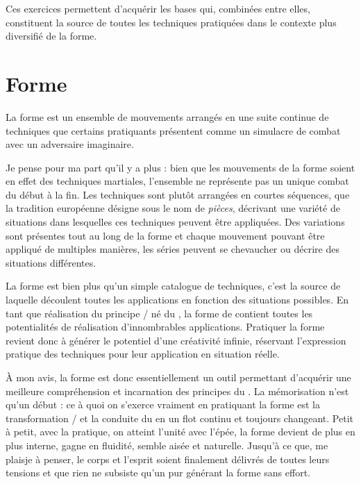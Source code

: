 Ces exercices permettent d'acquérir les bases qui, combinées entre elles, constituent la source de toutes les techniques pratiquées dans le contexte plus diversifié de la forme.


\section{Forme}
La forme est un ensemble de mouvements arrangés en une suite continue de techniques que certains pratiquants présentent comme un simulacre de combat avec un adversaire imaginaire.

Je pense pour ma part qu'il y a plus : bien que les mouvements de la forme soient en effet des techniques martiales, l'ensemble ne représente pas un unique combat du début à la fin. Les techniques sont plutôt arrangées en courtes séquences, que la tradition européenne désigne sous le nom de \textit{pièces}, décrivant une variété de situations dans lesquelles ces techniques peuvent être appliquées. Des variations sont présentes tout au long de la forme et chaque mouvement pouvant être appliqué de multiples manières, les séries peuvent se chevaucher ou décrire des situations différentes.

La forme est bien plus qu'un simple catalogue de techniques, c'est la source de laquelle découlent toutes les applications en fonction des situations possibles. En tant que réalisation du principe \Yin{}/\Yang{} né du \Taiji{}, la forme de \Taijijian{} contient toutes les potentialités de réalisation d'innombrables applications. Pratiquer la forme revient donc à générer le potentiel d'une créativité infinie, réservant l'expression pratique des techniques pour leur application en situation réelle.

\`{A} mon avis, la forme est donc essentiellement un outil permettant d'acquérir une meilleure compréhension et incarnation des principes du \Taiji{}.
La mémorisation n'est qu'un début : ce à quoi on s'exerce vraiment en pratiquant la forme est la transformation \Yin{}/\Yang{} et la conduite du \Yi{} en un flot continu et toujours changeant. 
Petit à petit, avec la pratique, on atteint l'unité avec l'épée, la forme devient de plus en plus interne, gagne en fluidité, semble aisée et naturelle.
Jusqu'à ce que, me plais\textendash{}je à penser, le corps et l'esprit soient finalement délivrés de toutes leurs tensions et que rien ne subsiste qu'un pur \Yi{} générant la forme sans effort.

